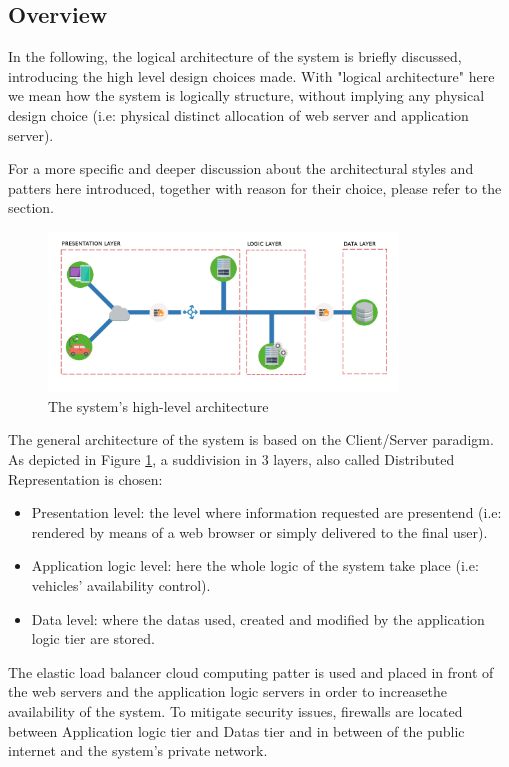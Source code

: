 \subsection{Overview}

In the following, the logical architecture of the system is briefly discussed, introducing the high level design choices made.
With "logical architecture" here we mean how the system is logically structure, without implying any physical design choice (i.e: physical distinct allocation of web server and application server).
 
For a more specific and deeper discussion about the architectural styles and patters here introduced, together with reason for their choice, please refer to the  section.

\begin{figure}[h]
	\centerline{
		\includegraphics[width=350px]{../Datas/images/PEhla.jpg}
	}
		\caption{The system's high-level architecture}
		\label{fig:high-lev-arch}
\end{figure}


The general architecture of the system is based on the Client/Server paradigm. As depicted in Figure \ref{fig:high-lev-arch}, a suddivision in 3 layers, also called Distributed Representation is chosen:
	\begin{itemize}
		\item Presentation level: the level where information requested are presentend (i.e: rendered by means of a web browser or simply delivered to the final user).
		\item Application logic level: here the whole logic of the system take place (i.e: vehicles' availability control).
		\item Data level: where the datas used, created and modified by the application logic tier are stored.
	\end{itemize}

The elastic load balancer cloud computing patter is used and placed in front of the web servers and the application logic servers in order to increasethe availability of the system.
To mitigate security issues, firewalls are located between Application logic tier and Datas tier and in between of the public internet and the system's private network.
